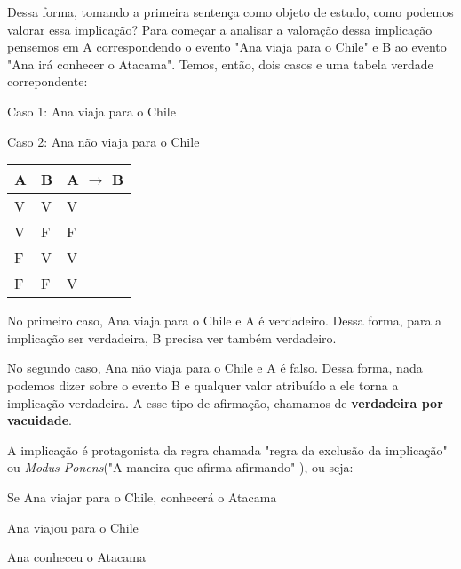 Dessa forma, tomando a primeira sentença como objeto de estudo, como podemos valorar essa implicação?
Para começar a analisar a valoração dessa implicação pensemos em A correspondendo o evento "Ana viaja para o Chile" e B ao evento "Ana irá conhecer o Atacama". Temos, então, dois casos e uma tabela verdade correpondente:

\begin{center}

Caso 1: Ana viaja para o Chile 

Caso 2: Ana não viaja para o Chile

\end{center}

\begin{table}[htb]
\centering
\begin{tabular}{|l|l|l|}
\hline

\textbf{A} & \textbf{B} & \textbf{A $\to$ B} \\ \hline
V          & V          & V                  \\ \hline
V          & F          & F                  \\ \hline
F          & V          & V                  \\ \hline
F          & F          & V                  \\ \hline

\end{tabular}
\end{table}

No primeiro caso, Ana viaja para o Chile e A é verdadeiro. Dessa forma, para a implicação ser verdadeira, B precisa ver também verdadeiro.

No segundo caso, Ana não viaja para o Chile e A é falso.
Dessa forma, nada podemos dizer sobre o evento B e qualquer valor atribuído a ele torna a implicação verdadeira. A esse tipo de afirmação, chamamos de \textbf{verdadeira por vacuidade}.

A implicação é protagonista da regra chamada "regra da exclusão da implicação" ou \textit{Modus Ponens}("A maneira que afirma afirmando" ), ou seja:

\begin{center}

Se Ana viajar para o Chile, conhecerá o Atacama

Ana viajou para o Chile

Ana conheceu o Atacama

\end{center}

